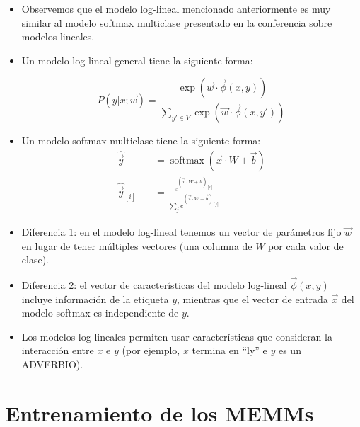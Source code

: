 \begin{itemize}
\item Observemos que el modelo log-lineal mencionado anteriormente es muy similar al modelo softmax multiclase presentado en la conferencia sobre modelos lineales.

\item Un modelo log-lineal general tiene la siguiente forma:

\begin{displaymath}
P(y | x; \vec{w}) = \frac{\exp (\vec{w}\cdot \vec{\phi}(x,y))}{\sum_{y' \in Y} \exp (\vec{w}\cdot \vec{\phi}(x,y'))}
\end{displaymath}


\item Un modelo softmax multiclase tiene la siguiente forma:
\begin{equation}
\begin{split}
\hat{\vec{y}} \quad & =  \operatorname{softmax}(\vec{x} \cdot W + \vec{b})  \\
\hat{\vec{y}}_{[i]} \quad & = \frac{e^{(\vec{x} \cdot W + \vec{b})_{[i]}}}{\sum_j e^{(\vec{x} \cdot W + \vec{b})_{[j]}}}
\end{split}
\end{equation}


\item Diferencia 1: en el modelo log-lineal tenemos un vector de parámetros fijo $\vec{w}$ en lugar de tener múltiples vectores (una columna de $W$ por cada valor de clase).

\item Diferencia 2: el vector de características del modelo log-lineal $\vec{\phi}(x,y)$ incluye información de la etiqueta $y$, mientras que el vector de entrada $\vec{x}$ del modelo softmax es independiente de $y$.

\item Los modelos log-lineales permiten usar características que consideran la interacción entre $x$ e $y$ (por ejemplo, $x$ termina en ``ly'' e $y$ es un ADVERBIO).


\end{itemize}



\section{Entrenamiento de los MEMMs}

